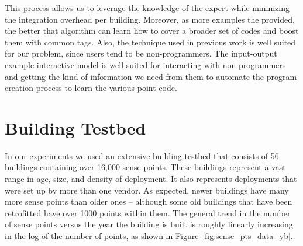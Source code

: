 This process allows us to leverage the knowledge of the expert while minimzing the integration
overhead per building.  Moreover, as more examples the provided, the better that 
algorithm can learn how to cover a broader set of codes and boost them with common tags.
Also, the technique used in previous work is well suited for our problem, since
users tend to be non-programmers.  The input-output example interactive model is well suited
for interacting with non-programmers and getting the kind of information we need from them
to automate the program creation process to learn the various point code. 



\section{Building Testbed}
In our experiments we used an extensive building testbed that 
consists of 56 buildings containing over 16,000 sense points. These buildings 
represent a vast range in age, size, and density of deployment.  It also represents deployments
that were set up by more than one vendor.  As expected, newer buildings have many more sense 
points than older ones -- although some old buildings that have been retrofitted have over 1000  
points within them. The general trend in the number of sense points versus the year the 
building is built is roughly linearly increasing in the log of the number of points, as shown
in Figure~\ref{fig:sense_pts_data_yb}.  

